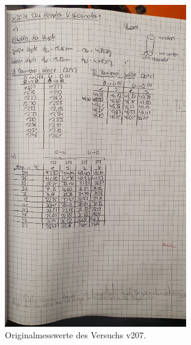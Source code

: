 \begin{figure}[H]
    \centering
    \includegraphics[width=0.7\textwidth]{./content/Originalwerte.JPG}
    \caption{Originalmesswerte des Versuchs v207.}
\end{figure}

%
